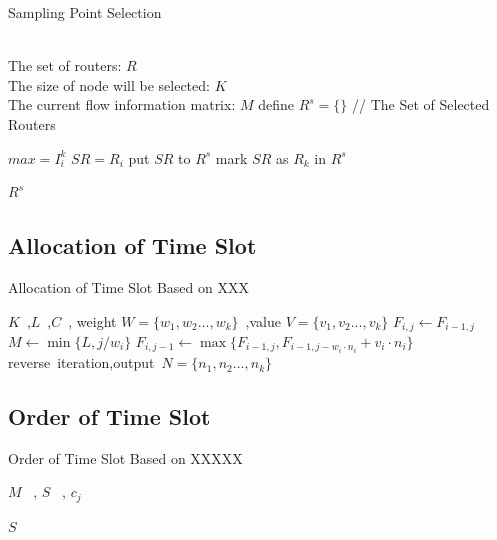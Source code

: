 \documentclass[conference,compsoc]{IEEEtran}
\begin{document}
\begin{algorithm}[h]
\caption{Sampling Point Selection}
\begin{algorithmic}[1]
\REQUIRE ~~\\ The set of routers: $ R$ \\  The size of node will be selected: $K$ \\ The current flow information matrix: $M$
\STATE define $R^s=\{\}$  //  The Set of Selected Routers


\STATE $max = I_i^k$
\STATE $SR = R_i$
\ENDIF
\ENDFOR
\STATE put $SR$ to $R^s$
\STATE mark $SR$ as $R_k$ in $R^s$
\ENDFOR

\RETURN $R^s$
\label{code:recentEnd}
\end{algorithmic}
\end{algorithm}



\subsection{Allocation of Time Slot}

\begin{algorithm}[h]
\caption{Allocation of Time Slot Based on XXX}
\begin{algorithmic}[1]
\REQUIRE  $K$~,$L$~,$C$~, weight $W=\{w_1,w_2...,w_k\}$~,value $V=\{v_1,v_2...,v_k\}$
\STATE $F_{i,j} \leftarrow F_{i-1,j}$
\ELSE 
\STATE $M \leftarrow \min \{ L,j/w_{i}\}$
\STATE $F_{i,j-1} \leftarrow \max \{ F_{i-1,j},F_{i-1,j-w_{i} \cdot n_{i}}+v_{i} \cdot n_{i}\}$
\ENDFOR
\ENDIF
\ENDFOR
\ENDFOR
\RETURN reverse~iteration,output~$N=\{n_{1},n_{2}...,n_{k}\}$
\label{code:recentEnd}
\end{algorithmic}
\end{algorithm}


\subsection{Order of Time Slot}
 
\begin{algorithm}[h]
\caption{Order of Time Slot Based on XXXXX}
\begin{algorithmic}[1]
\REQUIRE  $M$ ~, $S$ ~, $c_j$

\RETURN $S$
\label{code:recentEnd}
\end{algorithmic}
\end{algorithm}
\end{document}
